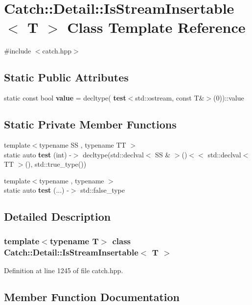 \section{Catch\+::Detail\+::Is\+Stream\+Insertable$<$ T $>$ Class Template Reference}
\label{class_catch_1_1_detail_1_1_is_stream_insertable}


{\ttfamily \#include $<$catch.\+hpp$>$}

\subsection*{Static Public Attributes}
\begin{DoxyCompactItemize}
\item 
static const bool \textbf{ value} = decltype(\textbf{ test}$<$std\+::ostream, const T\&$>$(0))\+::value
\end{DoxyCompactItemize}
\subsection*{Static Private Member Functions}
\begin{DoxyCompactItemize}
\item 
{\footnotesize template$<$typename SS , typename TT $>$ }\\static auto \textbf{ test} (int) -\/$>$ decltype(std\+::declval$<$ SS \& $>$()$<$$<$ std\+::declval$<$ TT $>$(), std\+::true\+\_\+type())
\item 
{\footnotesize template$<$typename , typename $>$ }\\static auto \textbf{ test} (...) -\/$>$ std\+::false\+\_\+type
\end{DoxyCompactItemize}


\subsection{Detailed Description}
\subsubsection*{template$<$typename T$>$\newline
class Catch\+::\+Detail\+::\+Is\+Stream\+Insertable$<$ T $>$}



Definition at line 1245 of file catch.\+hpp.



\subsection{Member Function Documentation}
\mbox{\label{class_catch_1_1_detail_1_1_is_stream_insertable_ac5981238a76d66e36b3d014aa870d15c}} 
